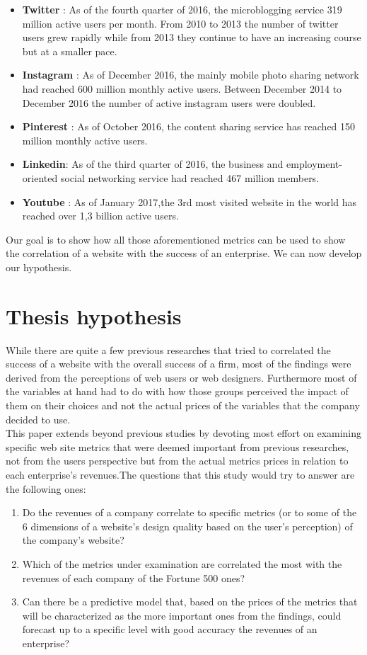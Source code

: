 \documentclass{book}
\begin{document}
\begin{itemize}
\item \textbf{Twitter} : As of the fourth quarter of 2016, the microblogging service 319 million active users per month.\cite{key28} From 2010 to 2013 the number of twitter users grew rapidly while from 2013 they continue to have an increasing course but at a smaller pace.
\item \textbf{Instagram} : As of December 2016, the mainly mobile photo sharing network had reached 600 million monthly active users.\cite{key29} Between December 2014 to December 2016 the number of active instagram users were doubled.
\item \textbf{Pinterest} : As of October 2016, the content sharing service has reached 150 million monthly active users.\cite{key47}
\item\textbf{Linkedin}: As of the third quarter of 2016, the business and employment-oriented social networking service had reached 467 million members.\cite{key31}
\item\textbf{Youtube} : As of January 2017,the 3rd most visited website in the world has reached over 1,3 billion active users.\cite{key32}
\end{itemize}
Our goal is to show how all those aforementioned metrics can be used to show the correlation of a website with the success of an enterprise. We can now develop our hypothesis. 
\newpage
\section{Thesis hypothesis}
While there are quite a few previous researches that tried to correlated the success of a website with the overall success of a firm, most of the findings were derived from the perceptions of web users or web designers. Furthermore most of the variables at hand had to do with how those groups perceived the impact of them on their choices and not the actual prices of the variables that the company decided to use.\\
This paper extends beyond previous studies by devoting most effort on examining specific web site metrics that were deemed important from previous researches, not from the users perspective but from the actual metrics prices in relation to each enterprise's revenues.The questions that this study would try to answer are the following ones:
\begin{enumerate}
\item Do the revenues of a company correlate to specific metrics (or to some of the 6 dimensions of a website's design quality based on the user's perception) of the company's website?
\item Which of the metrics under examination are correlated the most with the revenues of each company of the Fortune 500 ones?
\item Can there be a predictive model that, based on the prices of the metrics that will be characterized as the more important ones from the findings, could forecast up to a specific level with good accuracy the revenues of an enterprise?
\end{enumerate}
\end{document}
